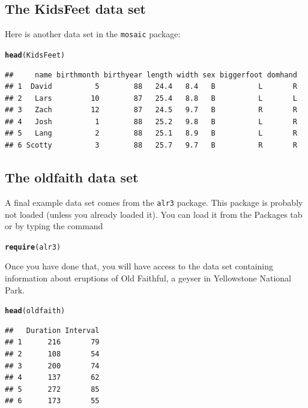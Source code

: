 \documentclass[twoside]{book}\usepackage[]{graphicx}\usepackage[]{xcolor}
\makeatletter
\newcommand{\hlstd}[1]{\textcolor[rgb]{0.345,0.345,0.345}{#1}}%
\newcommand{\hlkwd}[1]{\textcolor[rgb]{0.737,0.353,0.396}{\textbf{#1}}}%
\newenvironment{kframe}{%
 \def\at@end@of@kframe{}%
 \ifinner\ifhmode%
  \def\at@end@of@kframe{\end{minipage}}%
  \begin{minipage}{\columnwidth}%
 \fi\fi%
 \def\FrameCommand##1{\hskip\@totalleftmargin \hskip-\fboxsep
 \colorbox{shadecolor}{##1}\hskip-\fboxsep
     \hskip-\linewidth \hskip-\@totalleftmargin \hskip\columnwidth}%
 \MakeFramed {\advance\hsize-\width
   \@totalleftmargin\z@ \linewidth\hsize
   \@setminipage}}%
 {\par\unskip\endMakeFramed%
 \at@end@of@kframe}
\newenvironment{knitrout}{}{} %
\newcommand{\Rindex}[1]{\index{\texttt{#1}}}
\newcommand{\pkg}[1]{{\color{red!80!black}\texttt{#1}}\Rindex{#1}}
\def\tab#1{{\sf #1}}
\newcounter{example}[section]
\makeatother
\begin{document}
\subsection{The KidsFeet data set}
Here is another data set in the \pkg{mosaic} package:
\begin{knitrout}
\color{fgcolor}\begin{kframe}
\begin{alltt}
\hlkwd{head}\hlstd{(KidsFeet)}
\end{alltt}
\begin{verbatim}
##     name birthmonth birthyear length width sex biggerfoot domhand
## 1  David          5        88   24.4   8.4   B          L       R
## 2   Lars         10        87   25.4   8.8   B          L       L
## 3   Zach         12        87   24.5   9.7   B          R       R
## 4   Josh          1        88   25.2   9.8   B          L       R
## 5   Lang          2        88   25.1   8.9   B          L       R
## 6 Scotty          3        88   25.7   9.7   B          R       R
\end{verbatim}
\end{kframe}
\end{knitrout}

\subsection{The oldfaith data set}
A final example data set comes from the \pkg{alr3} package.  This package is probably not 
loaded (unless you already loaded it).  You can load it from the \tab{Packages} tab or
by typing the command
\begin{knitrout}
\color{fgcolor}\begin{kframe}
\begin{alltt}
\hlkwd{require}\hlstd{(alr3)}
\end{alltt}
\end{kframe}
\end{knitrout}
Once you have done that, you will have access to the data set containing information about
eruptions of Old Faithful, a geyser in Yellowstone National Park.
\begin{knitrout}
\color{fgcolor}\begin{kframe}
\begin{alltt}
\hlkwd{head}\hlstd{(oldfaith)}
\end{alltt}
\begin{verbatim}
##   Duration Interval
## 1      216       79
## 2      108       54
## 3      200       74
## 4      137       62
## 5      272       85
## 6      173       55
\end{verbatim}
\end{kframe}
\end{knitrout}
\end{document}
